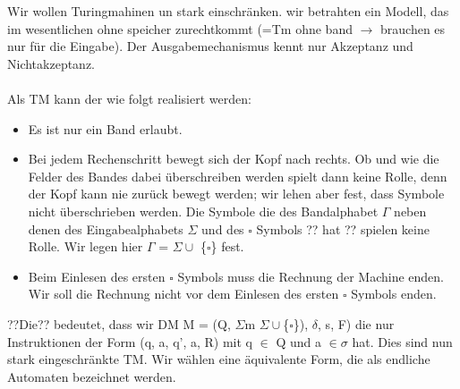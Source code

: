 Wir wollen Turingmahinen un stark einschränken. 
wir betrahten ein Modell, das im wesentlichen ohne speicher
zurechtkommt (=Tm ohne band $\longrightarrow$  brauchen es nur für die Eingabe).
Der Ausgabemechanismus kennt nur Akzeptanz und Nichtakzeptanz.\\\\
Als TM kann der wie folgt realisiert werden:
\begin{itemize}
    \item Es ist nur ein Band erlaubt.
    \item Bei jedem Rechenschritt bewegt sich der Kopf nach rechts. Ob und wie die Felder des Bandes dabei überschreiben werden spielt dann keine Rolle, denn der Kopf kann nie zurück bewegt werden; wir lehen aber fest, dass Symbole nicht überschrieben werden. Die Symbole die des Bandalphabet $\Gamma $ neben denen des Eingabealphabets $\Sigma $ und des $\square $  Symbols ?? hat ?? spielen keine Rolle. Wir legen hier $\varGamma $ = $\Sigma \cup $ \{$\square $\} fest.
    \item Beim Einlesen des ersten $\square $ Symbols muss die Rechnung der Machine enden. Wir soll die Rechnung nicht vor dem Einlesen des ersten $\square $ Symbols enden. 
\end{itemize}
??Die?? bedeutet, dass wir DM M = (Q, $\Sigma$m $\Sigma\cup $\{$\square $\}), $\delta$, s, F) die nur Instruktionen der Form (q, a, q', a, R) mit q $\in$ Q und a $\in \sigma$ hat.
Dies sind nun stark eingeschränkte TM. Wir wählen eine äquivalente Form, die als endliche Automaten bezeichnet werden. 

